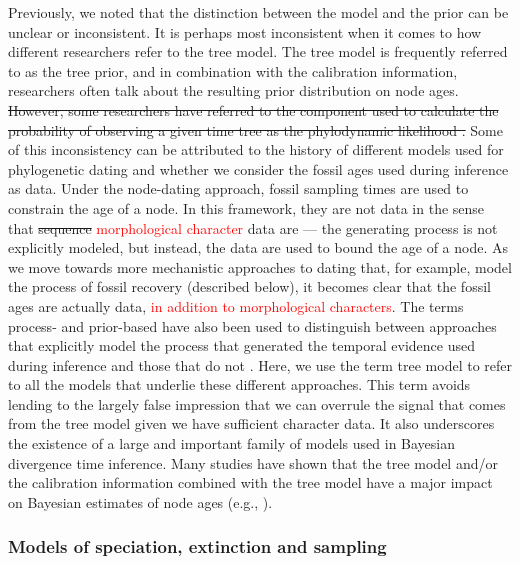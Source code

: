 \documentclass[11pt]{article}
\newcommand{\edit}[1]{{\textcolor{red}{#1}}} %
\begin{document}
Previously, we noted that the distinction between the model and the prior can be unclear or inconsistent. It is perhaps most inconsistent when it comes to how different researchers refer to the tree model.
The tree model is frequently referred to as the tree prior, and in combination with the calibration information, researchers often talk about the resulting prior distribution on node ages. %
\sout{However, some researchers have referred to the component used to calculate the probability of observing a given time tree as the phylodynamic likelihood \cite{Boskova2018}.}
Some of this inconsistency can be attributed to the history of different models used for phylogenetic dating %
and whether we consider the fossil ages used during inference as data.
Under the node-dating approach, fossil sampling times are used to constrain the age of a node.
In this framework, they are not data in the sense that \sout{sequence} \edit{morphological character} data are --- the generating process is not explicitly modeled, but instead, the data are used to bound the age of a node.
As we move towards more mechanistic approaches to dating that, for example, model the process of fossil recovery (described below), it becomes clear that the fossil ages are actually data, \edit{in addition to  morphological characters}.
The terms process- and prior-based have also been used to distinguish between approaches that explicitly model the  process that generated the temporal evidence used during inference and those that do not \cite{Landis2016}. 
Here, we use the term tree model to refer to all the models that underlie these different approaches.
This term avoids lending to the largely false impression that we can overrule the signal that comes from the tree model given we have sufficient character data. 
It also underscores the existence of a large and important family of models used in Bayesian divergence time inference.
Many studies have shown that the tree model and/or the calibration information combined with the tree model have a major impact on Bayesian estimates of node ages (e.g., \cite{Ho2009,Warnock2011,OReilly2015,matzke2016,Matschiner2017}).

\subsubsection{Models of speciation, extinction and sampling}
\end{document}
